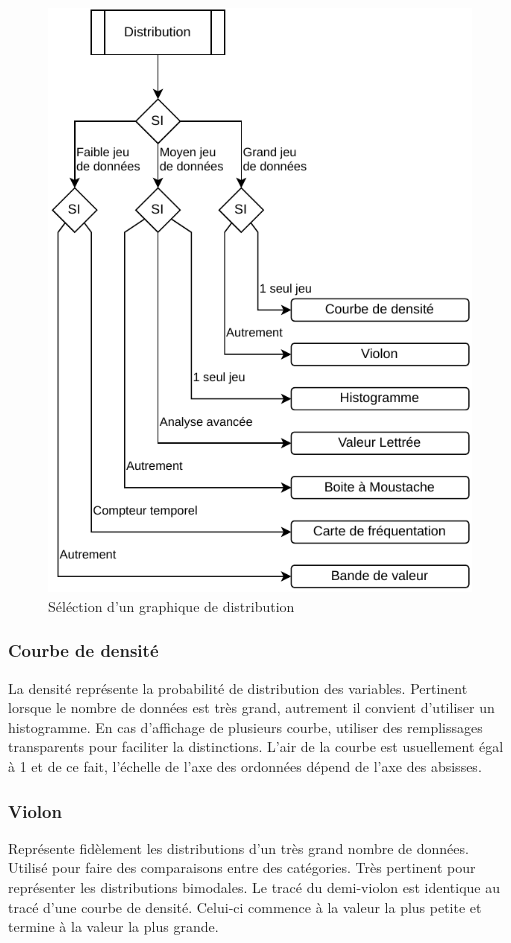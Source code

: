 \documentclass[a4paper,12pt]{article}
\begin{document}
\begin{multicols}{2}
\begin{figure}[H]
\centering
\includegraphics[width=.9\linewidth]{./img/select-distribution.pdf}
\caption{\label{fig:org5f6dae4}Séléction d'un graphique de distribution}
\end{figure}
\subsubsection*{Courbe de densité}
\label{sec:org1dfdfd2}
La densité représente la probabilité de distribution des variables. \autocite{sosulskiGraphics2019} Pertinent lorsque le nombre de données est très grand, autrement il convient d'utiliser un histogramme. \autocite{wilkeVisualizingManyDistributions2019} En cas d'affichage de plusieurs courbe, utiliser  des remplissages transparents pour faciliter la distinctions. L'air de la courbe est usuellement égal à 1 et de ce fait, l'échelle de l'axe des ordonnées dépend de l'axe des absisses. \autocite{wilkeVisualizingManyDistributions2019}
\subsubsection*{Violon}
\label{sec:org6b26ca8}
Représente fidèlement les distributions d'un très grand nombre de données. \autocite{alansmithLexiqueVisuel} Utilisé pour faire des comparaisons entre des catégories. \autocite{mikeyiHowChooseRight2020}  Très pertinent pour représenter les distributions bimodales. \autocite{wilkeVisualizingManyDistributions2019} Le tracé du demi-violon est identique au tracé d'une courbe de densité. Celui-ci commence à la valeur la plus petite et termine à la valeur la plus grande.

\end{multicols}
\end{document}
